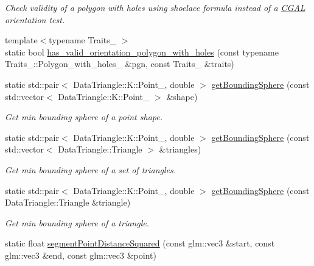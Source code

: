 \begin{DoxyCompactItemize}
\begin{DoxyCompactList}\small\item\em Check validity of a polygon with holes using shoelace formula instead of a \mbox{\hyperlink{namespace_c_g_a_l}{C\+G\+AL}} orientation test. \end{DoxyCompactList}\item 
{\footnotesize template$<$typename Traits\+\_ $>$ }\\static bool \mbox{\hyperlink{classpepr3d_1_1_geometry_utils_a0a4acf058ecff218c2f64cb92f6a4090}{has\+\_\+valid\+\_\+orientation\+\_\+polygon\+\_\+with\+\_\+holes}} (const typename Traits\+\_\+::\+Polygon\+\_\+with\+\_\+holes\+\_ \&pgn, const Traits\+\_ \&traits)
\item 
static std\+::pair$<$ Data\+Triangle\+::\+K\+::\+Point\+\_, double $>$ \mbox{\hyperlink{classpepr3d_1_1_geometry_utils_a982761c1e66eb293064c3acbffe5ede3}{get\+Bounding\+Sphere}} (const std\+::vector$<$ Data\+Triangle\+::\+K\+::\+Point\+\_ $>$ \&shape)
\begin{DoxyCompactList}\small\item\em Get min bounding sphere of a point shape. \end{DoxyCompactList}\item 
static std\+::pair$<$ Data\+Triangle\+::\+K\+::\+Point\+\_, double $>$ \mbox{\hyperlink{classpepr3d_1_1_geometry_utils_a89cc912fcdca2c33502aa050841d660e}{get\+Bounding\+Sphere}} (const std\+::vector$<$ Data\+Triangle\+::\+Triangle $>$ \&triangles)
\begin{DoxyCompactList}\small\item\em Get min bounding sphere of a set of triangles. \end{DoxyCompactList}\item 
static std\+::pair$<$ Data\+Triangle\+::\+K\+::\+Point\+\_, double $>$ \mbox{\hyperlink{classpepr3d_1_1_geometry_utils_a8a4bbf6d68fa3474b7ae286d584ebe94}{get\+Bounding\+Sphere}} (const Data\+Triangle\+::\+Triangle \&triangle)
\begin{DoxyCompactList}\small\item\em Get min bounding sphere of a triangle. \end{DoxyCompactList}\item 
\mbox{\label{classpepr3d_1_1_geometry_utils_a3c0957732e9c372ca63b5271cf91d98d}} 
static float \mbox{\hyperlink{classpepr3d_1_1_geometry_utils_a3c0957732e9c372ca63b5271cf91d98d}{segment\+Point\+Distance\+Squared}} (const glm\+::vec3 \&start, const glm\+::vec3 \&end, const glm\+::vec3 \&point)

\end{DoxyCompactItemize}
